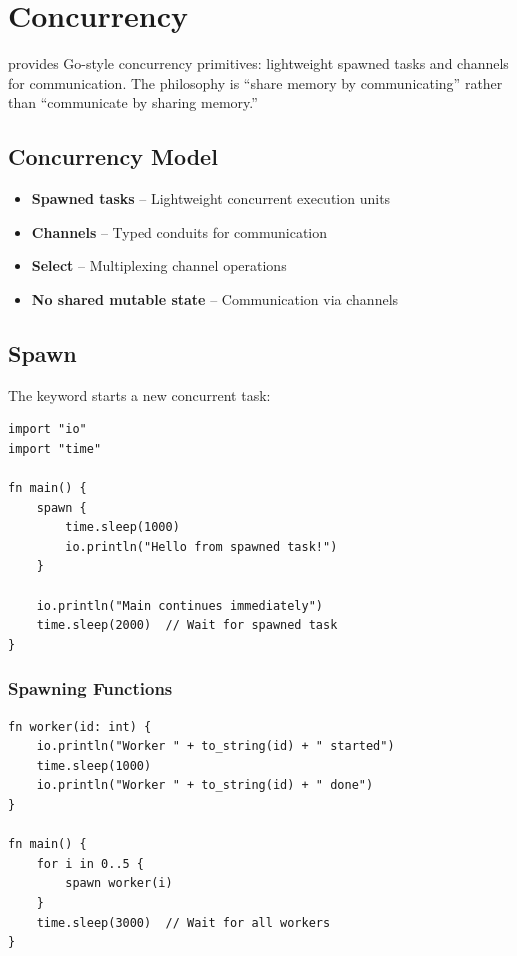 \chapter{Concurrency}
\label{ch:concurrency}

\haira{} provides Go-style concurrency primitives: lightweight spawned tasks and channels for communication. The philosophy is ``share memory by communicating'' rather than ``communicate by sharing memory.''

\section{Concurrency Model}

\begin{itemize}
    \item \textbf{Spawned tasks} -- Lightweight concurrent execution units
    \item \textbf{Channels} -- Typed conduits for communication
    \item \textbf{Select} -- Multiplexing channel operations
    \item \textbf{No shared mutable state} -- Communication via channels
\end{itemize}

\section{Spawn}

The  keyword starts a new concurrent task:

\begin{lstlisting}
import "io"
import "time"

fn main() {
    spawn {
        time.sleep(1000)
        io.println("Hello from spawned task!")
    }

    io.println("Main continues immediately")
    time.sleep(2000)  // Wait for spawned task
}
\end{lstlisting}

\subsection{Spawning Functions}

\begin{lstlisting}
fn worker(id: int) {
    io.println("Worker " + to_string(id) + " started")
    time.sleep(1000)
    io.println("Worker " + to_string(id) + " done")
}

fn main() {
    for i in 0..5 {
        spawn worker(i)
    }
    time.sleep(3000)  // Wait for all workers
}
\end{lstlisting}

